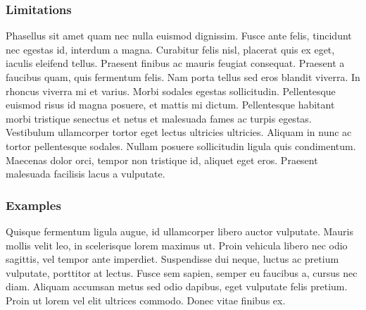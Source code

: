 \subsubsection{Limitations}
    Phasellus sit amet quam nec nulla euismod dignissim. Fusce ante felis, tincidunt nec egestas id, interdum a magna. Curabitur felis nisl, placerat quis ex eget, iaculis eleifend tellus. Praesent finibus ac mauris feugiat consequat. Praesent a faucibus quam, quis fermentum felis. Nam porta tellus sed eros blandit viverra. In rhoncus viverra mi et varius. Morbi sodales egestas sollicitudin. Pellentesque euismod risus id magna posuere, et mattis mi dictum. Pellentesque habitant morbi tristique senectus et netus et malesuada fames ac turpis egestas. Vestibulum ullamcorper tortor eget lectus ultricies ultricies. Aliquam in nunc ac tortor pellentesque sodales. Nullam posuere sollicitudin ligula quis condimentum. Maecenas dolor orci, tempor non tristique id, aliquet eget eros. Praesent malesuada facilisis lacus a vulputate.

\subsubsection{Examples}
    Quisque fermentum ligula augue, id ullamcorper libero auctor vulputate. Mauris mollis velit leo, in scelerisque lorem maximus ut. Proin vehicula libero nec odio sagittis, vel tempor ante imperdiet. Suspendisse dui neque, luctus ac pretium vulputate, porttitor at lectus. Fusce sem sapien, semper eu faucibus a, cursus nec diam. Aliquam accumsan metus sed odio dapibus, eget vulputate felis pretium. Proin ut lorem vel elit ultrices commodo. Donec vitae finibus ex.
